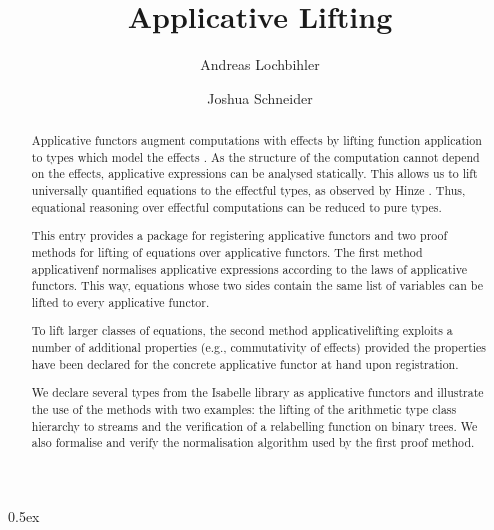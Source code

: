 \documentclass[11pt,a4paper]{article}
\begin{document}
\title{Applicative Lifting}
\author{Andreas Lochbihler \and Joshua Schneider}
\maketitle

\begin{abstract}
  Applicative functors augment computations with effects by lifting function application to types
  which model the effects \cite{mcbride08}.
  As the structure of the computation cannot depend on the effects, applicative expressions can be
  analysed statically.
  This allows us to lift universally quantified equations to the effectful types, as observed by 
  Hinze \cite{hinze10}.
  Thus, equational reasoning over effectful computations can be reduced to pure types.

  This entry provides a package for registering applicative functors and two proof methods for
  lifting of equations over applicative functors.
  The first method applicative{\isacharunderscore}nf normalises applicative expressions according to
  the laws of applicative functors.
  This way, equations whose two sides contain the same list of variables can be lifted to every
  applicative functor.

  To lift larger classes of equations, the second method applicative{\isacharunderscore}\linebreak lifting
  exploits a number of additional properties (e.g., commutativity of effects) provided the
  properties have been declared for the concrete applicative functor at hand upon registration.

  We declare several types from the Isabelle library as applicative functors and illustrate the use of
  the methods with two examples: the lifting of the arithmetic type class hierarchy to streams and
  the verification of a relabelling function on binary trees.
  We also formalise and verify the normalisation algorithm used by the first proof method.
\end{abstract}

\tableofcontents

\parindent 0pt\parskip 0.5ex





\end{document}

